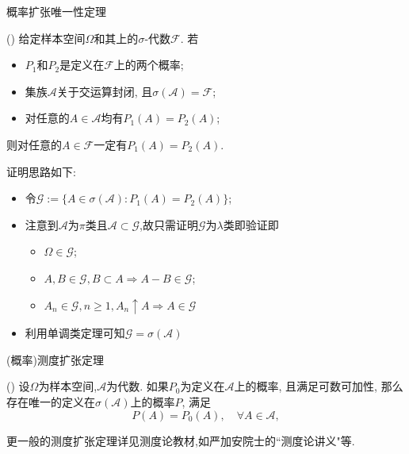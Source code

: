 \begin{frame}{概率扩张唯一性定理}
\begin{thm}() 给定样本空间${\Omega}$和其上的${\sigma}$-代数$\mathcal{F}$. 若
\begin{itemize}[<+-|alert@+>]
	\item $P_{1}$和${P_{2}}$是定义在${\mathcal{F}}$上的两个概率;
	\item 集族${\mathcal{A}}$关于交运算封闭, 且${\sigma(\mathcal{A})=\mathcal{F}}$;
	\item 对任意的$A\in \mathcal{A}$均有${P_{1}(A)=P_{2}(A)}$;
\end{itemize}
 则对任意的$A\in \mathcal{F}$一定有${P_{1}(A)=P_{2}(A)}$.
\end{thm}
\pause

\zheng 证明思路如下:
	\begin{itemize}[<+-|alert@+>]
	\item 令$\mathcal{G}:=\{A\in \sigma(\mathcal{A}):P_1(A)=P_2(A)\}$;
	\item 注意到$\mathcal{A}$为$\pi$类且$\mathcal{A}\subset \mathcal{G}$,故只需证明$\mathcal{G}$为$\lambda$类即验证即
	  \begin{itemize}[<+-|alert@+>]
	  \item $\Omega\in \mathcal{G}$;
	  \item $A, B\in \mathcal{G}, B\subset A\Rightarrow A-B\in \mathcal{G}$;
	  \item $A_n\in \mathcal{G}, n\geq 1, A_n\uparrow A\Rightarrow A\in \mathcal{G}$
	  \end{itemize}
	\item 利用单调类定理可知$\mathcal{G}=\sigma(\mathcal{A})$
	\end{itemize}


\end{frame}


\begin{frame}{(概率)测度扩张定理}
\begin{thm}() 设$\Omega$为样本空间,$\mathcal{A}$为代数. %
如果$P_{0}$为定义在$\mathcal{A}$上的概率, 且满足可数可加性, 那么存在唯一的定义在$\sigma(\mathcal{A})$上的概率$P$, 满足
	\[
	P(A)=P_{0}(A),  \quad \forall A \in \mathcal{A},
	\]
\end{thm}


\begin{rmk}
更一般的测度扩张定理详见测度论教材,如严加安院士的``测度论讲义"等.
\end{rmk}
\end{frame}

